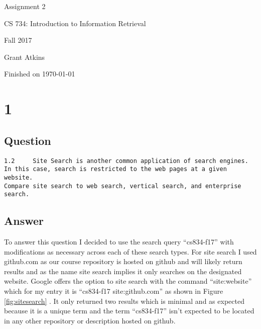 \documentclass[letterpaper,11pt]{article}
\begin{document}
\begin{titlepage}

\begin{center}

\Huge{Assignment 2}

\Large{CS 734:  Introduction to Information Retrieval}

\Large{Fall 2017}

\Large{Grant Atkins}

\Large Finished on \today

\end{center}

\end{titlepage}

\newpage


\section*{1}

\subsection*{Question}

\begin{verbatim}
1.2 	Site Search is another common application of search engines.
In this case, search is restricted to the web pages at a given website.
Compare site search to web search, vertical search, and enterprise search.
\end{verbatim}

\subsection*{Answer}

To answer this question I decided to use the search query ``cs834-f17'' with modifications as necessary across each of these search types.
For site search I used github.com as our course repository is hosted on github and will likely return results and as the name site search implies it only searches on the designated website.
Google offers the option to site search with the command ``site:website'' which for my entry it is ``cs834-f17 site:github.com''  as shown in Figure \ref{fig:sitesearch} \cite{googlesite}.
It only returned two results which is minimal and as expected because it is a unique term and the term ``cs834-f17'' isn't expected to be located in any other repository or description hosted on github.
\end{document}

